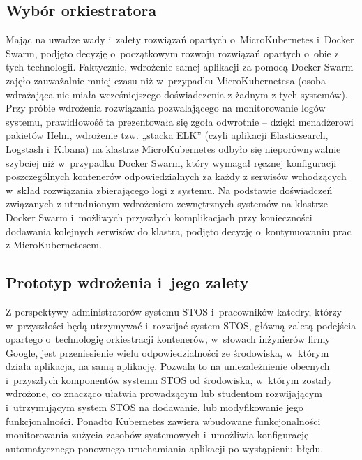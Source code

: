 \subsection{Wybór orkiestratora}
Mając na uwadze wady i~zalety rozwiązań opartych o~MicroKubernetes i~Docker Swarm, podjęto decyzję o~początkowym rozwoju rozwiązań opartych o~obie z tych technologii. Faktycznie, wdrożenie samej aplikacji za pomocą Docker Swarm zajęło zauważalnie mniej czasu niż w~przypadku MicroKubernetesa (osoba wdrażająca nie miała wcześniejszego doświadczenia z żadnym z tych systemów). Przy próbie wdrożenia rozwiązania pozwalającego na monitorowanie logów systemu, prawidłowość ta prezentowała się zgoła odwrotnie -- dzięki menadżerowi pakietów Helm, wdrożenie tzw. „stacka ELK” (czyli aplikacji Elasticsearch, Logstash i~Kibana) na klastrze MicroKubernetes odbyło się nieporównywalnie szybciej niż w~przypadku Docker Swarm, który wymagał ręcznej konfiguracji poszczególnych kontenerów odpowiedzialnych za każdy z serwisów wchodzących w~skład rozwiązania zbierającego logi z systemu. Na podstawie doświadczeń związanych z utrudnionym wdrożeniem zewnętrznych systemów na klastrze Docker Swarm i~możliwych przyszłych komplikacjach przy konieczności dodawania kolejnych serwisów do klastra, podjęto decyzję o~kontynuowaniu prac z MicroKubernetesem.

\subsection{Prototyp wdrożenia i~jego zalety}
Z perspektywy administratorów systemu STOS i~pracowników katedry, którzy w~przyszłości będą utrzymywać i~rozwijać system STOS, główną zaletą podejścia opartego o~technologię orkiestracji kontenerów, w~słowach inżynierów firmy Google\cite{googleKubernetes}, jest przeniesienie wielu odpowiedzialności ze środowiska, w~którym działa aplikacja, na samą aplikację. Pozwala to na uniezależnienie obecnych i~przyszłych komponentów systemu STOS od środowiska, w~którym zostały wdrożone, co znacząco ułatwia prowadzącym lub studentom rozwijającym i~utrzymującym system STOS na dodawanie, lub modyfikowanie jego funkcjonalności. Ponadto Kubernetes zawiera wbudowane funkcjonalności monitorowania zużycia zasobów systemowych i~umożliwia konfigurację automatycznego ponownego uruchamiania aplikacji po wystąpieniu błędu\cite{k8sPod}.

